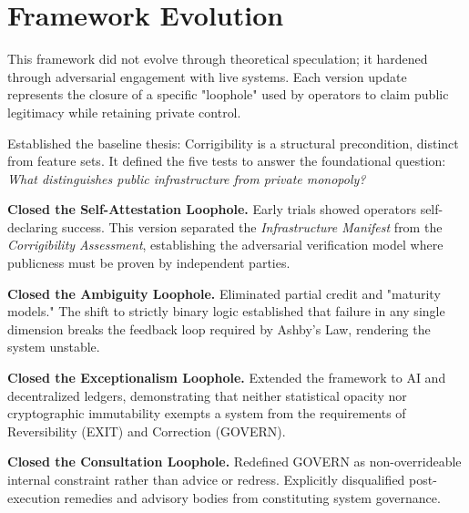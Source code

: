 \documentclass{article}
\begin{document}
\section{Framework Evolution}
\label{appendix:evolution}

This framework did not evolve through theoretical speculation; it hardened through adversarial engagement with live systems. Each version update represents the closure of a specific "loophole" used by operators to claim public legitimacy while retaining private control.

\begin{description}[style=nextline, leftmargin=1em, labelindent=0pt]

\item[\textbf{Version 1.0 (Definition)}]
Established the baseline thesis: Corrigibility is a structural precondition, distinct from feature sets. It defined the five tests to answer the foundational question: \textit{What distinguishes public infrastructure from private monopoly?}

\item[\textbf{Version 1.2 (Assessment)}]
\textbf{Closed the Self-Attestation Loophole.} Early trials showed operators self-declaring success. This version separated the \textit{Infrastructure Manifest} from the \textit{Corrigibility Assessment}, establishing the adversarial verification model where publicness must be proven by independent parties.

\item[\textbf{Version 1.4 (Logic)}]
\textbf{Closed the Ambiguity Loophole.} Eliminated partial credit and "maturity models." The shift to strictly binary logic established that failure in any single dimension breaks the feedback loop required by Ashby's Law, rendering the system unstable.

\item[\textbf{Version 1.5 (Invariance)}]
\textbf{Closed the Exceptionalism Loophole.} Extended the framework to AI and decentralized ledgers, demonstrating that neither statistical opacity nor cryptographic immutability exempts a system from the requirements of Reversibility (EXIT) and Correction (GOVERN).

\item[\textbf{Version 1.6 (Constraint)}]
\textbf{Closed the Consultation Loophole.} Redefined GOVERN as non-overrideable internal constraint rather than advice or redress. Explicitly disqualified post-execution remedies and advisory bodies from constituting system governance.


\end{description}
\end{document}
